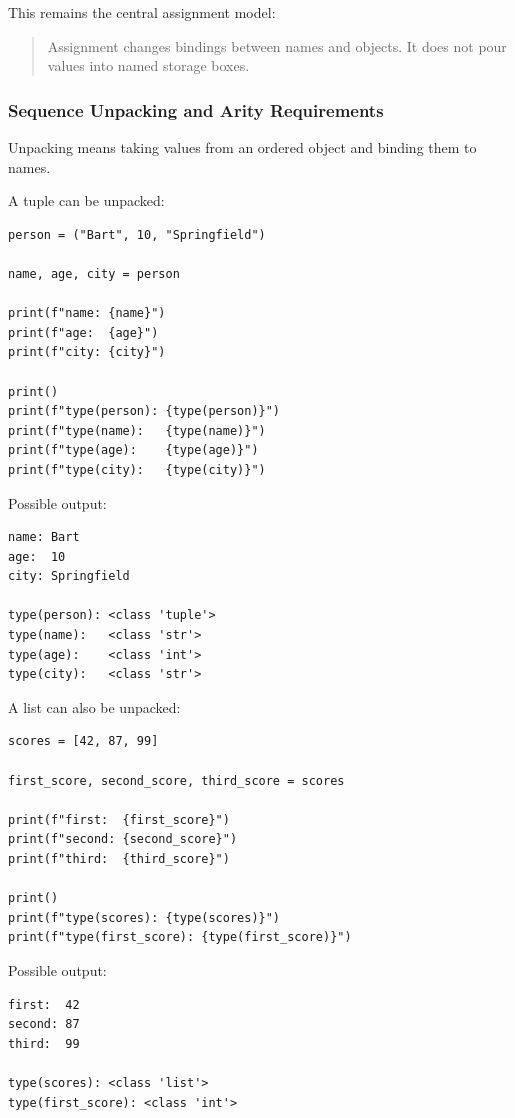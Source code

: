 This remains the central assignment model:

\begin{quote}
Assignment changes bindings between names and objects. It does not pour values into named storage boxes.
\end{quote}

\subsubsection{Sequence Unpacking and Arity Requirements}

Unpacking means taking values from an ordered object and binding them to names.

A tuple can be unpacked:

\begin{verbatim}
person = ("Bart", 10, "Springfield")

name, age, city = person

print(f"name: {name}")
print(f"age:  {age}")
print(f"city: {city}")

print()
print(f"type(person): {type(person)}")
print(f"type(name):   {type(name)}")
print(f"type(age):    {type(age)}")
print(f"type(city):   {type(city)}")
\end{verbatim}

Possible output:

\begin{verbatim}
name: Bart
age:  10
city: Springfield

type(person): <class 'tuple'>
type(name):   <class 'str'>
type(age):    <class 'int'>
type(city):   <class 'str'>
\end{verbatim}

A list can also be unpacked:

\begin{verbatim}
scores = [42, 87, 99]

first_score, second_score, third_score = scores

print(f"first:  {first_score}")
print(f"second: {second_score}")
print(f"third:  {third_score}")

print()
print(f"type(scores): {type(scores)}")
print(f"type(first_score): {type(first_score)}")
\end{verbatim}

Possible output:

\begin{verbatim}
first:  42
second: 87
third:  99

type(scores): <class 'list'>
type(first_score): <class 'int'>
\end{verbatim}

